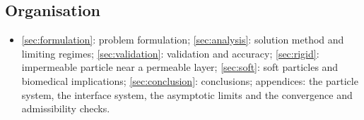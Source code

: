 \subsection*{Organisation}
\begin{itemize}
  \item \cref{sec:formulation}: problem formulation; \cref{sec:analysis}: solution method and limiting regimes;
        \cref{sec:validation}: validation and accuracy; \cref{sec:rigid}: impermeable particle near a permeable layer;
        \cref{sec:soft}: soft particles and biomedical implications; \cref{sec:conclusion}: conclusions; appendices:
        the particle system, the interface system, the asymptotic limits and the convergence and admissibility checks.
\end{itemize}
